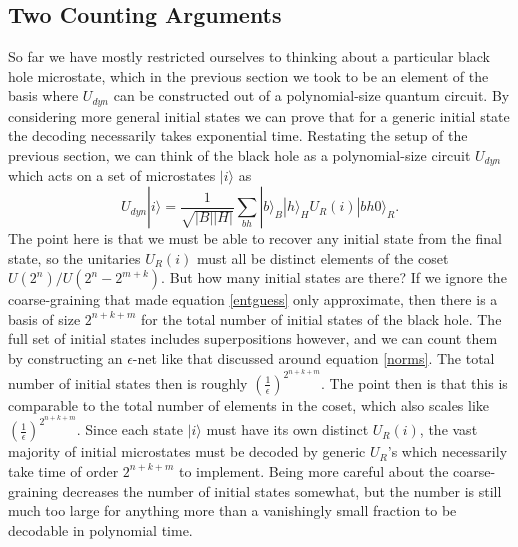 \documentclass[12pt]{article}
\newcommand{\be}{\begin{equation}}
\newcommand{\ee}{\end{equation}}
\newcommand{\ran}{\rangle}
\begin{document}
\subsection{Two Counting Arguments}
So far we have mostly restricted ourselves to thinking about a particular black hole microstate, which in the previous section we took to be an element of the basis where $U_{dyn}$ can be constructed out of a polynomial-size quantum circuit.  By considering more general initial states we can prove that for a generic initial state the decoding necessarily takes exponential time.  Restating the setup of the previous section, we can think of the black hole as a polynomial-size circuit $U_{dyn}$ which acts on a set of microstates $|i\ran$ as
\be
U_{dyn}|i\ran=\frac{1}{\sqrt{|B||H|}}\sum_{bh}|b\ran_B|h\ran_H U_R(i)|bh0\ran_R.
\ee
The point here is that we must be able to recover any initial state from the final state, so the unitaries $U_R(i)$ must all be distinct elements of the coset $U(2^n)/U(2^n-2^{m+k})$.  But how many initial states are there? If we ignore the coarse-graining that made equation \eqref{entguess} only approximate, then there is a basis of size $2^{n+k+m}$ for the total number of initial states of the black hole.  The full set of initial states includes superpositions however, and we can count them by constructing an $\epsilon$-net like that discussed around equation \eqref{norms}.  The total number of initial states then is roughly $\left(\frac{1}{\epsilon}\right)^{2^{n+k+m}}$.  The point then is that this is comparable to the total number of elements in the coset, which also scales like $\left(\frac{1}{\epsilon}\right)^{2^{n+k+m}}$.  Since each state $|i\ran$ must have its own distinct $U_R(i)$, the vast majority of initial microstates must be decoded by generic $U_R$'s which necessarily take time of order $2^{n+k+m}$ to implement.  Being more careful about the coarse-graining decreases the number of initial states somewhat, but the number is still much too large for anything more than a vanishingly small fraction to be decodable in polynomial time.  
\end{document}
